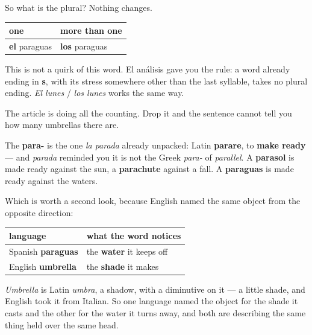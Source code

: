 \begin{grammarlens}[title={Grammar Lens: the plural that does not move}]
So what is the plural? Nothing changes.

\noindent
\begin{tabularx}{\linewidth}{@{}>{\raggedright\arraybackslash}X>{\raggedright\arraybackslash}X@{}}
\toprule
\textbf{one} & \textbf{more than one} \\
\midrule
\textbf{el} paraguas & \textbf{los} paraguas \\
\bottomrule
\end{tabularx}

This is not a quirk of this word. El análisis gave you the rule: a word already ending in \textbf{s}, with its stress somewhere other than the last syllable, takes no plural ending. \emph{El lunes} / \emph{los lunes} works the same way.

The article is doing all the counting. Drop it and the sentence cannot tell you how many umbrellas there are.
\end{grammarlens}

\begin{cousinweb}
The \textbf{para-} is the one \emph{la parada} already unpacked: Latin \textbf{parare}, to \textbf{make ready} — and \emph{parada} reminded you it is not the Greek \emph{para-} of \emph{parallel}. A \textbf{parasol} is made ready against the sun, a \textbf{parachute} against a fall. A \textbf{paraguas} is made ready against the waters.

Which is worth a second look, because English named the same object from the opposite direction:

\noindent
\begin{tabularx}{\linewidth}{@{}>{\raggedright\arraybackslash}X>{\raggedright\arraybackslash}X@{}}
\toprule
\textbf{language} & \textbf{what the word notices} \\
\midrule
Spanish \textbf{paraguas} & the \textbf{water} it keeps off \\
English \textbf{umbrella} & the \textbf{shade} it makes \\
\bottomrule
\end{tabularx}

\emph{Umbrella} is Latin \emph{umbra}, a shadow, with a diminutive on it — a little shade, and English took it from Italian. So one language named the object for the shade it casts and the other for the water it turns away, and both are describing the same thing held over the same head.
\end{cousinweb}

